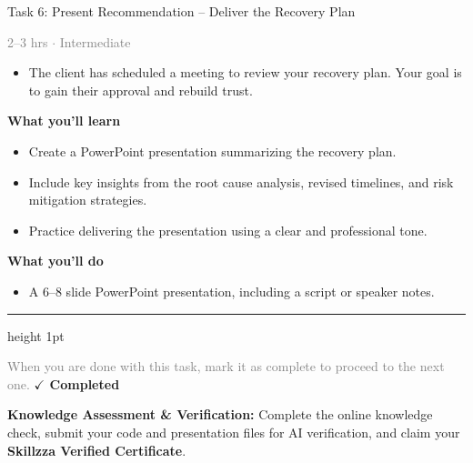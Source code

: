 \documentclass[10pt,a4paper]{article}
\begin{document}
\begin{taskbox}{Task 6: Present Recommendation – Deliver the Recovery Plan}

    {\small \textcolor{gray}{2--3 hrs $\cdot$ Intermediate}}\\[12pt]

\begin{itemize}
    \item The client has scheduled a meeting to review your recovery plan. Your goal is to gain their approval and rebuild trust.

\end{itemize}
\vspace{8pt}
{\large \textbf{\textcolor{brandLight}{What you'll learn}}}\\[4pt] 
\begin{itemize}
    \item Create a PowerPoint presentation summarizing the recovery plan.
    \item Include key insights from the root cause analysis, revised timelines, and risk mitigation strategies.
    \item Practice delivering the presentation using a clear and professional tone.

\end{itemize}
{\large \textbf{\textcolor{brandLight}{What you'll do}}}\\[4pt] 
\begin{itemize}
    \item A 6–8 slide PowerPoint presentation, including a script or speaker notes.\par
\end{itemize}

    \vspace{16pt}

    \textcolor{cardBorder}{\hrule height 1pt}\vspace{8pt}

    \small \textcolor{gray}{When you are done with this task, mark it as complete to proceed to the next one.} \hfill \textbf{\textcolor{brandDark}{$\checkmark$ Completed}}

\end{taskbox}

\begin{completionbox}
    \textbf{Knowledge Assessment \& Verification:} Complete the online knowledge check, submit your code and presentation files for AI verification, and claim your \textbf{Skillzza Verified Certificate}.
\end{completionbox}
\end{document}
